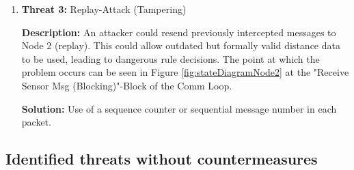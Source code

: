 \begin{enumerate}
        \paragraph{} 
		\item \textbf{Threat 3:} Replay-Attack (Tampering)
            
            \textbf{Description:} An attacker could resend previously intercepted messages to Node 2 (replay). This could allow outdated but formally valid distance data to be used, leading to dangerous rule decisions. The point at which the problem occurs can be seen in Figure \ref{fig:stateDiagramNode2} at the "Receive Sensor Msg (Blocking)"-Block of the Comm Loop.
            
            \textbf{Solution:} Use of a sequence counter or sequential message number in each packet.
        
        \paragraph{} 
	\end{enumerate}
	
\subsection{Identified threats without countermeasures}

